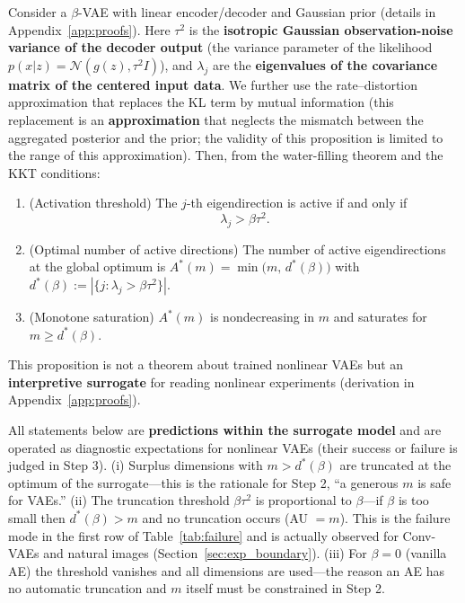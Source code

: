\documentclass[make,article,submit,pdftex,moreauthors]{Definitions/mdpi}
\newcommand{\dstar}{d^{*}(\beta)}
\begin{document}
\begin{Proposition}\label{thm:linear_vae}
Consider a $\beta$-VAE with linear encoder/decoder and Gaussian prior
(details in Appendix~\ref{app:proofs}).
Here $\tau^2$ is the \textbf{isotropic Gaussian observation-noise variance
of the decoder output} (the variance parameter of the likelihood
$p(x|z) = \mathcal{N}(g(z), \tau^2 I)$), and $\lambda_j$ are the
\textbf{eigenvalues of the covariance matrix of the centered input data}.
We further use the rate--distortion approximation that replaces the KL term
by mutual information (this replacement is an \textbf{approximation} that
neglects the mismatch between the aggregated posterior and the prior; the
validity of this proposition is limited to the range of this
approximation).
Then, from the water-filling theorem and the KKT conditions:
\begin{enumerate}
  \item (Activation threshold) The $j$-th eigendirection is active if and
        only if
        \begin{equation}
          \lambda_j > \beta \tau^2 .
          \label{eq:au_threshold}
        \end{equation}
  \item (Optimal number of active directions)
        The number of active eigendirections at the global optimum is
        $A^*(m) = \min\bigl(m,\, \dstar\bigr)$ with
        $\dstar := |\{j : \lambda_j > \beta\tau^2\}|$.
  \item (Monotone saturation) $A^*(m)$ is nondecreasing in $m$ and
        saturates for $m \geq \dstar$.
\end{enumerate}
This proposition is not a theorem about trained nonlinear VAEs but an
\textbf{interpretive surrogate} for reading nonlinear experiments
(derivation in Appendix~\ref{app:proofs}).
\end{Proposition}

\begin{Remark}\label{rem:implication}
All statements below are \textbf{predictions within the surrogate model}
and are operated as diagnostic expectations for nonlinear VAEs (their
success or failure is judged in Step 3).
(i) Surplus dimensions with $m > \dstar$ are truncated at the optimum of
the surrogate---this is the rationale for Step 2, ``a generous $m$ is safe
for VAEs.''
(ii) The truncation threshold $\beta\tau^2$ is proportional to $\beta$---if
$\beta$ is too small then $\dstar > m$ and no truncation occurs
(AU $= m$).
This is the failure mode in the first row of Table~\ref{tab:failure} and is
actually observed for Conv-VAEs and natural images
(Section~\ref{sec:exp_boundary}).
(iii) For $\beta = 0$ (vanilla AE) the threshold vanishes and all
dimensions are used---the reason an AE has no automatic truncation and $m$
itself must be constrained in Step 2.
\end{Remark}
\end{document}
